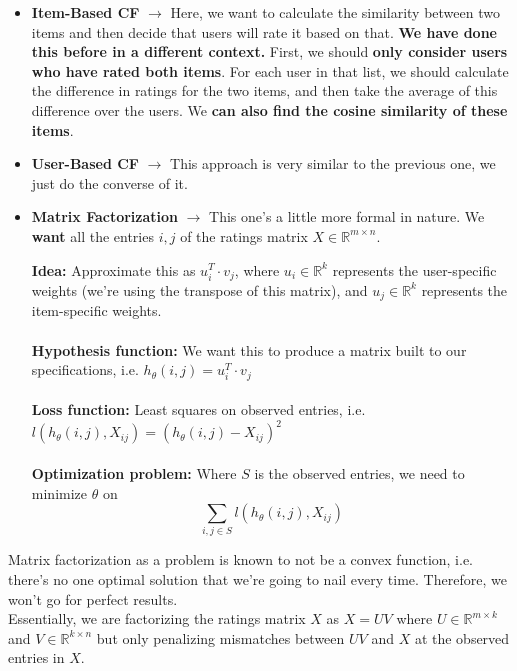 \documentclass[english, 10pt]{article}
\begin{document}
\begin{itemize}
	\item \textbf{Item-Based CF} $\rightarrow$ Here, we want to calculate the similarity between two items and then decide that users will rate it based on that. \textbf{We have done this before in a different context.} First, we should \textbf{only consider users who have rated both items}. For each user in that list, we should calculate the difference in ratings for the two items, and then take the average of this difference over the users. We \textbf{can also find the cosine similarity of these items}.
	\item \textbf{User-Based CF} $\rightarrow$ This approach is very similar to the previous one, we just do the converse of it.
	\item \textbf{Matrix Factorization} $\rightarrow$ This one's a little more formal in nature. We \textbf{want} all the entries $i, j$ of the ratings matrix $X \in \mathbb{R}^{m \times n}$.\\
	\begin{myproof}
	\textbf{Idea:} Approximate this as $u_i^T \cdot v_j$, where $u_i \in \mathbb{R}^k$ represents the user-specific weights (we're using the transpose of this matrix), and $u_j \in \mathbb{R}^k$ represents the item-specific weights.\\\\
	\textbf{Hypothesis function:} We want this to produce a matrix built to our specifications, i.e. $h_{\theta}(i,j)=u_i^T \cdot v_j$\\\\
	\textbf{Loss function:} Least squares on observed entries, i.e. $l(h_{\theta}(i,j),X_{ij})=(h_{\theta}(i,j)-X_{ij})^2$\\\\
	\textbf{Optimization problem:} Where $S$ is the observed entries, we need to minimize $\theta$ on $$\sum_{i,j \in S}{l(h_{\theta}(i,j),X_{ij})}$$
	\end{myproof}
	
\end{itemize}

Matrix factorization as a problem is known to not be a convex function, i.e. there's no one optimal solution that we're going to nail every time. Therefore, we won't go for perfect results.\\

Essentially, we are factorizing the ratings matrix $X$ as $X = UV$ where $U \in \mathbb{R}^{m \times k}$ and $V \in \mathbb{R}^{k \times n}$ but only penalizing mismatches between $UV$ and $X$ at the observed entries in $X$.
\end{document}
